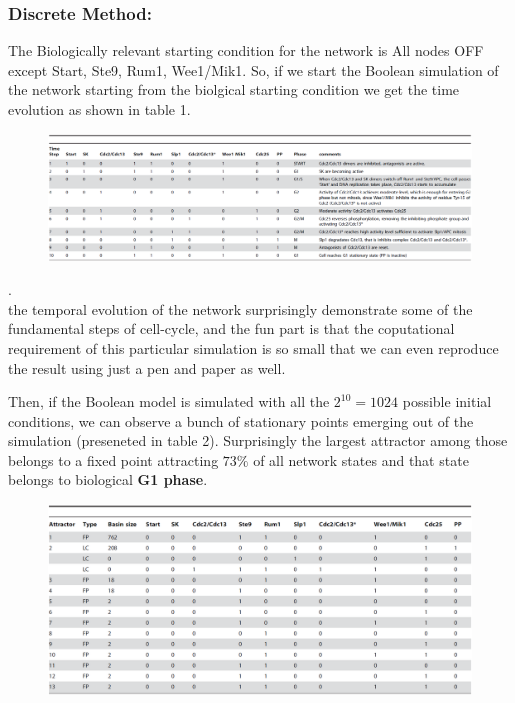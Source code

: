 \documentclass{article}
\begin{document}
\subsubsection*{Discrete Method:}
The Biologically relevant starting condition for the network is All nodes OFF 
except Start, Ste9, Rum1, Wee1/Mik1. So, if we start the Boolean simulation of 
the network starting from the biolgical starting condition we get the time evolution
as shown in table 1.
\begin{figure}[H]
  \centering
  \includegraphics[width=\linewidth, scale=0.5]{bio_start_state_evo.png} \\
\end{figure}
.\\
the temporal evolution of the network surprisingly demonstrate some of the 
fundamental steps of cell-cycle, and the fun part is that the coputational 
requirement of this particular simulation is so small that we can even 
reproduce the result using just a pen and paper as well.

Then, if the Boolean model is simulated with all the $2^10 = 1024$ possible 
initial conditions, we can observe a bunch of stationary points emerging out 
of the simulation (preseneted in table 2). Surprisingly the largest attractor 
among those belongs to a fixed point attracting $73\%$ of all network states 
and that state belongs to biological \textbf{G1 phase}.
\begin{figure}[H]
  \centering
  \includegraphics[width=\linewidth, scale=0.5]{fixed_point_bool.png} \\
\end{figure}
\end{document}
